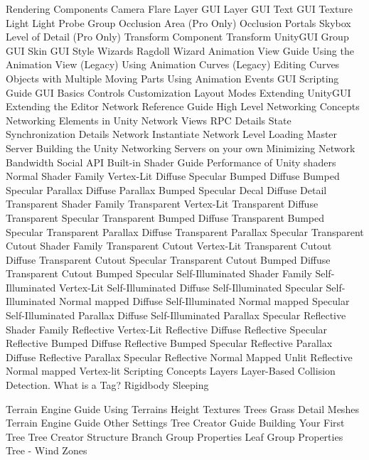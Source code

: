   Rendering Components
  Camera
  Flare Layer
  GUI Layer
  GUI Text
  GUI Texture
  Light
  Light Probe Group
  Occlusion Area (Pro Only)
  Occlusion Portals
  Skybox
  Level of Detail (Pro Only)
  Transform Component
  Transform
  UnityGUI Group
  GUI Skin
  GUI Style
  Wizards
  Ragdoll Wizard
Animation View Guide
  Using the Animation View (Legacy)
  Using Animation Curves (Legacy)
  Editing Curves
  Objects with Multiple Moving Parts
  Using Animation Events
GUI Scripting Guide
  GUI Basics
  Controls
  Customization
  Layout Modes
  Extending UnityGUI
  Extending the Editor
Network Reference Guide
  High Level Networking Concepts
  Networking Elements in Unity
  Network Views
  RPC Details
  State Synchronization Details
  Network Instantiate
  Network Level Loading
  Master Server
  Building the Unity Networking Servers on your own
  Minimizing Network Bandwidth
  Social API
Built-in Shader Guide
  Performance of Unity shaders
  Normal Shader Family
  Vertex-Lit
  Diffuse
  Specular
  Bumped Diffuse
  Bumped Specular
  Parallax Diffuse
  Parallax Bumped Specular
  Decal
  Diffuse Detail
  Transparent Shader Family
  Transparent Vertex-Lit
  Transparent Diffuse
  Transparent Specular
  Transparent Bumped Diffuse
  Transparent Bumped Specular
  Transparent Parallax Diffuse
  Transparent Parallax Specular
  Transparent Cutout Shader Family
  Transparent Cutout Vertex-Lit
  Transparent Cutout Diffuse
  Transparent Cutout Specular
  Transparent Cutout Bumped Diffuse
  Transparent Cutout Bumped Specular
  Self-Illuminated Shader Family
  Self-Illuminated Vertex-Lit
  Self-Illuminated Diffuse
  Self-Illuminated Specular
  Self-Illuminated Normal mapped Diffuse
  Self-Illuminated Normal mapped Specular
  Self-Illuminated Parallax Diffuse
  Self-Illuminated Parallax Specular
  Reflective Shader Family
  Reflective Vertex-Lit
  Reflective Diffuse
  Reflective Specular
  Reflective Bumped Diffuse
  Reflective Bumped Specular
  Reflective Parallax Diffuse
  Reflective Parallax Specular
  Reflective Normal Mapped Unlit
  Reflective Normal mapped Vertex-lit
Scripting Concepts
  Layers
  Layer-Based Collision Detection.
  What is a Tag?
  Rigidbody Sleeping
  
Terrain Engine Guide
  Using Terrains
  Height
  Textures
  Trees
  Grass
  Detail Meshes
  Terrain Engine Guide
  Other Settings
Tree Creator Guide
  Building Your First Tree
  Tree Creator Structure
  Branch Group Properties
  Leaf Group Properties
  Tree - Wind Zones
